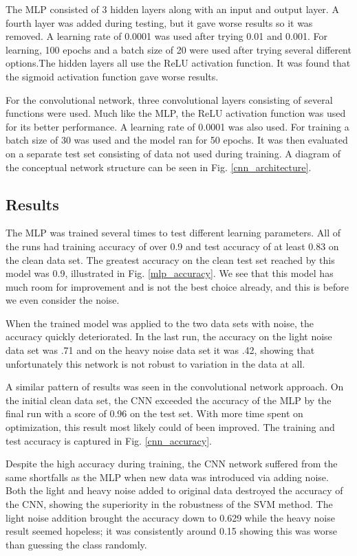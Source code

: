 \documentclass[12pt]{article}
\begin{document}
\begin{multicols*}{2}
The MLP consisted of 3 hidden layers along with an input and output layer. A fourth layer was added during testing, but it gave worse results so it was removed. A learning rate of 0.0001 was used after trying 0.01 and 0.001. For learning, 100 epochs and a batch size of 20 were used after trying several different options.The hidden layers all use the ReLU activation function. It was found that the sigmoid activation function gave worse results.

For the convolutional network, three convolutional layers consisting of several functions were used. Much like the MLP, the ReLU activation function was used for its better performance. A learning rate of 0.0001 was also used. For training a batch size of 30 was used and the model ran for 50 epochs. It was then evaluated on a separate test set consisting of data not used during training. A diagram of the conceptual network structure can be seen in Fig. \ref{cnn_architecture}. 

\subsection*{Results}
The MLP was trained several times to test different learning parameters. All of the runs had training accuracy of over 0.9 and test accuracy of at least 0.83 on the clean data set. The greatest accuracy on the clean test set reached by this model was 0.9, illustrated in Fig. \ref{mlp_accuracy}. We see that this model has much room for improvement and is not the best choice already, and this is before we even consider the noise.

When the trained model was applied to the two data sets with noise, the accuracy quickly deteriorated. In the last run, the accuracy on the light noise data set was .71 and on the heavy noise data set it was .42, showing that unfortunately this network is not robust to variation in the data at all. 

A similar pattern of results was seen in the convolutional network approach. On the initial clean data set, the CNN exceeded the accuracy of the MLP by the final run with a score of 0.96 on the test set. With more time spent on optimization, this result most likely could of been improved. The training and test accuracy is captured in Fig. \ref{cnn_accuracy}.

Despite the high accuracy during training, the CNN network suffered from the same shortfalls as the MLP when new data was introduced via adding noise. Both the light and heavy noise added to original data destroyed the accuracy of the CNN, showing the superiority in the robustness of the SVM method. The light noise addition brought the accuracy down to 0.629 while the heavy noise result seemed hopeless; it was consistently around 0.15 showing this was worse than guessing the class randomly.


\end{multicols*}
\end{document}
